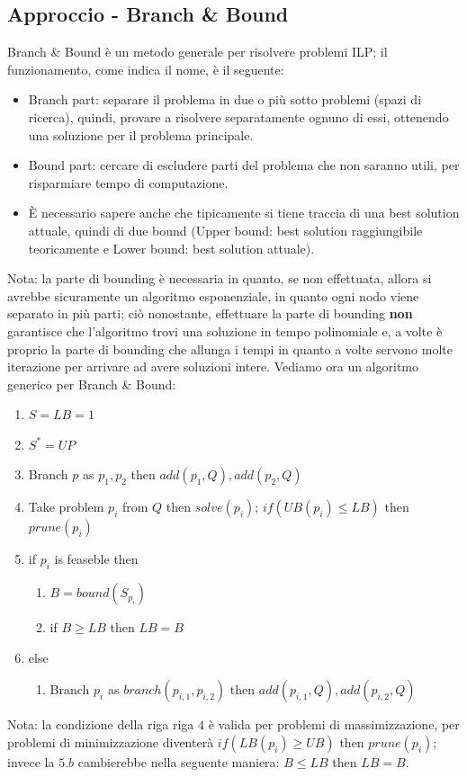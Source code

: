 \documentclass[12pt,a4paper]{article}
\begin{document}
\subsection{Approccio - Branch \& Bound}
Branch \& Bound è un metodo generale per risolvere problemi ILP; il funzionamento, come indica il nome, è il seguente:
\begin{itemize}
\item Branch part: separare il problema in due o più sotto problemi (spazi di ricerca), quindi, provare a risolvere separatamente ognuno di essi, ottenendo una soluzione per il problema principale.
\item Bound part: cercare di escludere parti del problema che non saranno utili, per risparmiare tempo di computazione.
\item È necessario sapere anche che tipicamente si tiene traccia di una best solution attuale, quindi di due bound (Upper bound: best solution raggiungibile teoricamente e Lower bound: best solution attuale).
\end{itemize}
Nota: la parte di bounding è necessaria in quanto, se non effettuata, allora si avrebbe sicuramente un algoritmo esponenziale, in quanto ogni nodo viene separato in più parti; ciò nonostante, effettuare la parte di bounding \textbf{non} garantisce che l'algoritmo trovi una soluzione in tempo polinomiale e, a volte è proprio la parte di bounding che allunga i tempi in quanto a volte servono molte iterazione per arrivare ad avere soluzioni intere.
Vediamo ora un algoritmo generico per Branch \& Bound:
\begin{enumerate}
\item $S = LB = 1$
\item $S^* = UP$
\item Branch $p$ as $p_1, p_2$ then $add(p_1, Q), add(p_2, Q)$
\item Take problem $p_i$ from $Q$ then $solve(p_i)$; $if(UB(p_i) \leq LB)$ then $prune(p_i)$
\item if $p_i$ is feaseble then
\begin{enumerate}
\item $B = bound(S_{p_{i}})$
\item if $B \geq LB$ then  $LB = B$
\end{enumerate}
\item else
\begin{enumerate}
\item Branch $p_i$ as $branch(p_{i, 1}, p_{i, 2})$ then $add(p_{i, 1}, Q), add(p_{i, 2}, Q)$
\end{enumerate}
\end{enumerate}
Nota: la condizione della riga riga $4$ è valida per problemi di massimizzazione, per problemi di minimizzazione diventerà $if(LB(p_i) \geq UB)$ then $prune(p_i)$; invece la $5.b$ cambierebbe nella seguente maniera: $B \leq LB$ then  $LB = B$.
\end{document}
